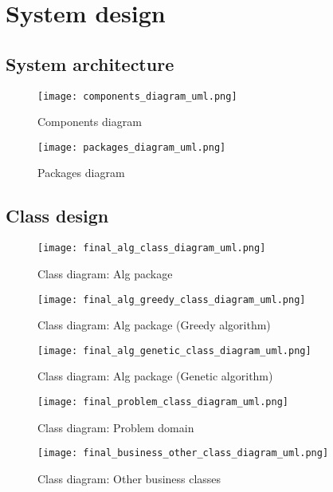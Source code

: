 \renewcommand{\documentname}{System design}

\chapter{System design}


\section{System architecture}


\begin{figure}[H]
    \caption{Components diagram}
  \centering
  \texttt{[image: components\_diagram\_uml.png]}
\end{figure}

\begin{figure}[H]
    \caption{Packages diagram}
  \centering
  \texttt{[image: packages\_diagram\_uml.png]}
\end{figure}




\section{Class design}


\begin{figure}[H]
    \caption{Class diagram: Alg package}
  \centering
  \texttt{[image: final\_alg\_class\_diagram\_uml.png]}
\end{figure}

\begin{figure}[H]
    \caption{Class diagram: Alg package (Greedy algorithm)}
  \centering
  \texttt{[image: final\_alg\_greedy\_class\_diagram\_uml.png]}
\end{figure}

\begin{figure}[H]
    \caption{Class diagram: Alg package (Genetic algorithm)}
  \centering
  \texttt{[image: final\_alg\_genetic\_class\_diagram\_uml.png]}
\end{figure}

\begin{figure}[H]
    \caption{Class diagram: Problem domain}
  \centering
  \texttt{[image: final\_problem\_class\_diagram\_uml.png]}
\end{figure}

\begin{figure}[H]
    \caption{Class diagram: Other business classes}
  \centering
  \texttt{[image: final\_business\_other\_class\_diagram\_uml.png]}
\end{figure}

